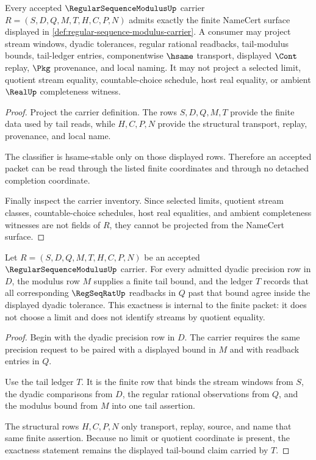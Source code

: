 \begin{theorem}
\label{thm:regular-sequence-modulus-carrier-admission}
Every accepted $\RegularSequenceModulusUp$ carrier
$R=(S,D,Q,M,T,H,C,P,N)$ admits exactly the finite NameCert surface displayed in \autoref{def:regular-sequence-modulus-carrier}. A consumer may project stream windows, dyadic tolerances, regular rational readbacks, tail-modulus bounds, tail-ledger entries, componentwise $\hsame$ transport, displayed $\Cont$ replay, $\Pkg$ provenance, and local naming. It may not project a selected limit, quotient stream equality, countable-choice schedule, host real equality, or ambient $\RealUp$ completeness witness.
\end{theorem}
\begin{proof}
Project the carrier definition. The rows $S,D,Q,M,T$ provide the finite data used by tail reads, while $H,C,P,N$ provide the structural transport, replay, provenance, and local name.

The classifier is hsame-stable only on those displayed rows. Therefore an accepted packet can be read through the listed finite coordinates and through no detached completion coordinate.

Finally inspect the carrier inventory. Since selected limits, quotient stream classes, countable-choice schedules, host real equalities, and ambient completeness witnesses are not fields of $R$, they cannot be projected from the NameCert surface.
\end{proof}

\begin{theorem}
\label{thm:regular-sequence-modulus-tail-exactness}
Let $R=(S,D,Q,M,T,H,C,P,N)$ be an accepted $\RegularSequenceModulusUp$ carrier. For every admitted dyadic precision row in $D$, the modulus row $M$ supplies a finite tail bound, and the ledger $T$ records that all corresponding $\RegSeqRatUp$ readbacks in $Q$ past that bound agree inside the displayed dyadic tolerance. This exactness is internal to the finite packet: it does not choose a limit and does not identify streams by quotient equality.
\end{theorem}
\begin{proof}
Begin with the dyadic precision row in $D$. The carrier requires the same precision request to be paired with a displayed bound in $M$ and with readback entries in $Q$.

Use the tail ledger $T$. It is the finite row that binds the stream windows from $S$, the dyadic comparisons from $D$, the regular rational observations from $Q$, and the modulus bound from $M$ into one tail assertion.

The structural rows $H,C,P,N$ only transport, replay, source, and name that same finite assertion. Because no limit or quotient coordinate is present, the exactness statement remains the displayed tail-bound claim carried by $T$.
\end{proof}

